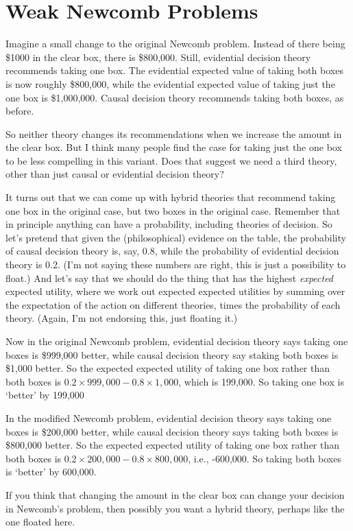 \section{Weak Newcomb Problems}
Imagine a small change to the original Newcomb problem. Instead of there being \$1000 in the clear box, there is \$800,000. Still, evidential decision theory recommends taking one box. The evidential expected value of taking both boxes is now roughly \$800,000, while the evidential expected value of taking just the one box is \$1,000,000. Causal decision theory recommends taking both boxes, as before.

So neither theory changes its recommendations when we increase the amount in the clear box. But I think many people find the case for taking just the one box to be less compelling in this variant. Does that suggest we need a third theory, other than just causal or evidential decision theory?

It turns out that we can come up with hybrid theories that recommend taking one box in the original case, but two boxes in the original case. Remember that in principle anything can have a probability, including theories of decision. So let's pretend that given the (philosophical) evidence on the table, the probability of causal decision theory is, say, 0.8, while the probability of evidential decision theory is 0.2. (I'm not saying these numbers are right, this is just a possibility to float.) And let's say that we should do the thing that has the highest \textit{expected} expected utility, where we work out expected expected utilities by summing over the expectation of the action on different theories, times the probability of each theory. (Again, I'm not endorsing this, just floating it.)

Now in the original Newcomb problem, evidential decision theory says taking one boxes is \$999,000 better, while causal decision theory say staking both boxes is \$1,000 better. So the expected expected utility of taking one box rather than both boxes is $0.2 \times 999,000 - 0.8 \times 1,000$, which is 199,000. So taking one box is `better' by 199,000

In the modified Newcomb problem, evidential decision theory says taking one boxes is \$200,000 better, while causal decision theory says taking both boxes is \$800,000 better. So the expected expected utility of taking one box rather than both boxes is $0.2 \times 200,000 - 0.8 \times 800,000$, i.e., -600,000. So taking both boxes is `better' by 600,000.

If you think that changing the amount in the clear box can change your decision in Newcomb's problem, then possibly you want a hybrid theory, perhaps like the one floated here.
